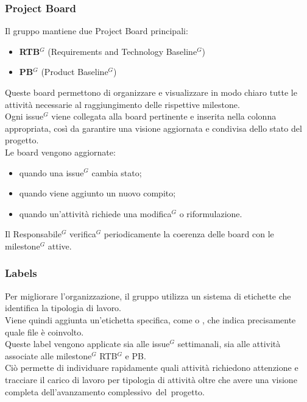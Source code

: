 \subsubsection{Project Board}
Il gruppo mantiene due Project Board principali:
\begin{itemize}[itemsep=3pt, parsep=1pt, label=$\scriptstyle\bullet$]
    \item \textbf{RTB$^G$} (Requirements and Technology Baseline$^G$)
    \item \textbf{PB$^G$} (Product Baseline$^G$)
\end{itemize}
Queste board permettono di organizzare e visualizzare in modo chiaro tutte le attività necessarie al raggiungimento delle rispettive milestone.\\
Ogni issue$^G$ viene collegata alla board pertinente e inserita nella colonna appropriata, così da garantire una visione aggiornata e condivisa dello stato del progetto.\\
Le board vengono aggiornate:
\begin{itemize}[itemsep=3pt, parsep=1pt, label=$\scriptstyle\bullet$]
    \item quando una issue$^G$ cambia stato;
    \item quando viene aggiunto un nuovo compito;
    \item quando un’attività richiede una modifica$^G$ o riformulazione.
\end{itemize}
Il Responsabile$^G$ verifica$^G$ periodicamente la coerenza delle board con le milestone$^G$ attive.

\subsubsection{Labels}
Per migliorare l'organizzazione, il gruppo utilizza un sistema di etichette che identifica la tipologia di lavoro.\\
Viene quindi aggiunta un'etichetta specifica, come  o , che indica precisamente quale file è coinvolto.\\
Queste label vengono applicate sia alle issue$^G$ settimanali, sia alle attività associate alle milestone$^G$ RTB$^G$ e PB.\\
Ciò permette di individuare rapidamente quali attività richiedono attenzione e tracciare il carico di lavoro per tipologia di attività oltre che avere una visione completa dell'avanzamento complessivo del progetto.

